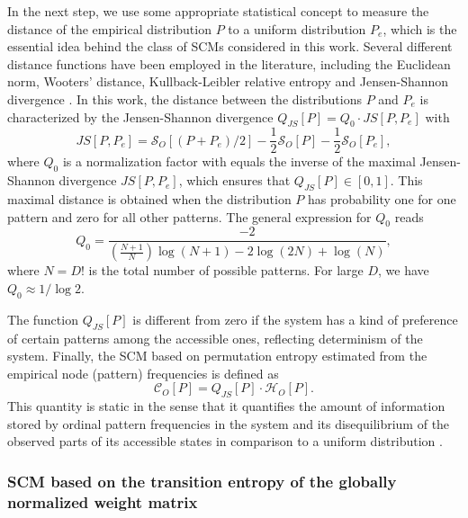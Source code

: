 \documentclass[aip,cha,reprint,nofootinbib]{revtex4-1}
\begin{document}
In the next step, we use some appropriate statistical concept to measure the distance of the empirical distribution $P$ to a uniform distribution $P_e$, which is the essential idea behind the class of SCMs considered in this work. Several different distance functions have been employed in the literature, including the Euclidean norm, Wooters' distance, Kullback-Leibler relative entropy and Jensen-Shannon divergence \cite{kowalskiEntropy2011}. In this work, the distance between the distributions $P$ and $P_e$ is characterized by the Jensen-Shannon divergence $Q_{JS}[P] = Q_0 \cdot JS[P, P_e]$ with 
\begin{equation}
JS[P, P_e] = \mathcal{S}_O[(P+P_e)/2] - \frac{1}{2}\mathcal{S}_O[P] - \frac{1}{2}\mathcal{S}_O[P_e], 
\end{equation}
where $Q_0$ is a normalization factor with equals the inverse of the maximal Jensen-Shannon divergence $JS[P, P_e]$, which ensures that $Q_{JS}[P] \in [0, 1]$. This maximal distance is obtained when the distribution $P$ has probability one for one pattern and zero for all other patterns. The general expression for $Q_0$ reads  
\begin{equation} \label{eq:Q0}
Q_0 = \frac{-2}{\left(\frac{N+1}{N}\right) \log (N+1) -2 \log (2N) + \log (N)},
\end{equation}
where $N = D!$ is the total number of possible patterns. For large $D$, we have $Q_0 \approx 1 /  \log 2$. 

The function $Q_{JS}[P]$ is different from zero if the system has a kind of preference of certain patterns among the accessible ones, reflecting determinism of the system. Finally, the SCM based on permutation entropy estimated from the empirical node (pattern) frequencies is defined as 
\begin{equation}
\mathcal{C}_{O}[P] = Q_{JS}[P] \cdot \mathcal{H}_{O}[P].
\end{equation}
This quantity is static in the sense that it quantifies the amount of information stored by ordinal pattern frequencies in the system and its disequilibrium of the observed parts of its accessible states in comparison to a uniform distribution \cite{LopezPLA1995}. 

\subsubsection{SCM based on the transition entropy of the globally normalized weight matrix} 
\end{document}
